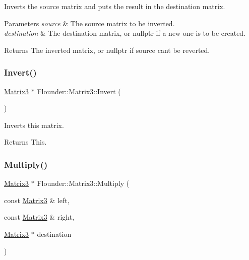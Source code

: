 Inverts the source matrix and puts the result in the destination matrix. 


\begin{DoxyParams}{Parameters}
{\em source} & The source matrix to be inverted. \\
\hline
{\em destination} & The destination matrix, or nullptr if a new one is to be created. \\
\hline
\end{DoxyParams}
\begin{DoxyReturn}{Returns}
The inverted matrix, or nullptr if source can\textquotesingle{}t be reverted. 
\end{DoxyReturn}
\mbox{\label{class_flounder_1_1_matrix3_a56c101bb989a3241a624ccfec4d2a493}} 
\subsubsection{\texorpdfstring{Invert()}{Invert()}\hspace{0.1cm}{\footnotesize\ttfamily [2/2]}}
{\footnotesize\ttfamily \hyperlink{class_flounder_1_1_matrix3}{Matrix3} $\ast$ Flounder\+::\+Matrix3\+::\+Invert (\begin{DoxyParamCaption}{ }\end{DoxyParamCaption})}



Inverts this matrix. 

\begin{DoxyReturn}{Returns}
This. 
\end{DoxyReturn}
\mbox{\label{class_flounder_1_1_matrix3_a91c2860023e1e5ef22fdef714eded8d6}} 
\subsubsection{\texorpdfstring{Multiply()}{Multiply()}}
{\footnotesize\ttfamily \hyperlink{class_flounder_1_1_matrix3}{Matrix3} $\ast$ Flounder\+::\+Matrix3\+::\+Multiply (\begin{DoxyParamCaption}\item[{const \hyperlink{class_flounder_1_1_matrix3}{Matrix3} \&}]{left,  }\item[{const \hyperlink{class_flounder_1_1_matrix3}{Matrix3} \&}]{right,  }\item[{\hyperlink{class_flounder_1_1_matrix3}{Matrix3} $\ast$}]{destination }\end{DoxyParamCaption})\hspace{0.3cm}{\ttfamily [static]}}



